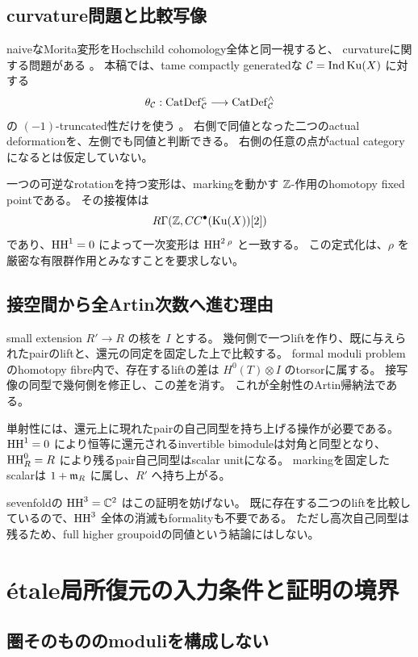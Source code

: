 \subsection{curvature問題と比較写像}

naiveなMorita変形をHochschild cohomology全体と同一視すると、
curvatureに関する問題がある \cite{KL}。
本稿では、tame compactly generatedな \(\mathcal C=\operatorname{Ind}\operatorname{Ku}(X)\) に対する
\[
 \theta_{\mathcal C}:\operatorname{CatDef}_{\mathcal C}^c
 \longrightarrow\operatorname{CatDef}_{\mathcal C}^{\wedge}
\]
の \((-1)\)-truncated性だけを使う \cite{Lurie,BKP}。
右側で同値となった二つのactual deformationを、左側でも同値と判断できる。
右側の任意の点がactual categoryになるとは仮定していない。

一つの可逆なrotationを持つ変形は、markingを動かす \(\mathbb Z\)-作用のhomotopy fixed pointである。
その接複体は
\[
 R\Gamma(\mathbb Z,CC^\bullet(\operatorname{Ku}(X))[2])
\]
であり、\(\operatorname{HH}^1=0\) によって一次変形は \(\operatorname{HH}^2{}^\rho\) と一致する。
この定式化は、\(\rho\) を厳密な有限群作用とみなすことを要求しない。

\subsection{接空間から全Artin次数へ進む理由}

small extension \(R'\to R\) の核を \(I\) とする。
幾何側で一つliftを作り、既に与えられたpairのliftと、還元の同定を固定した上で比較する。
formal moduli problemのhomotopy fibre内で、存在するliftの差は
\(H^0(T)\otimes I\) のtorsorに属する。
接写像の同型で幾何側を修正し、この差を消す。
これが全射性のArtin帰納法である。

単射性には、還元上に現れたpairの自己同型を持ち上げる操作が必要である。
\(\operatorname{HH}^1=0\) により恒等に還元されるinvertible bimoduleは対角と同型となり、
\(\operatorname{HH}^0_R=R\) により残るpair自己同型はscalar unitになる。
markingを固定したscalarは \(1+\mathfrak m_R\) に属し、\(R'\) へ持ち上がる。

sevenfoldの \(\operatorname{HH}^3=\mathbb C^2\) はこの証明を妨げない。
既に存在する二つのliftを比較しているので、\(\operatorname{HH}^3\) 全体の消滅もformalityも不要である。
ただし高次自己同型は残るため、full higher groupoidの同値という結論にはしない。

\section{étale局所復元の入力条件と証明の境界}

\subsection{圏そのもののmoduliを構成しない}

